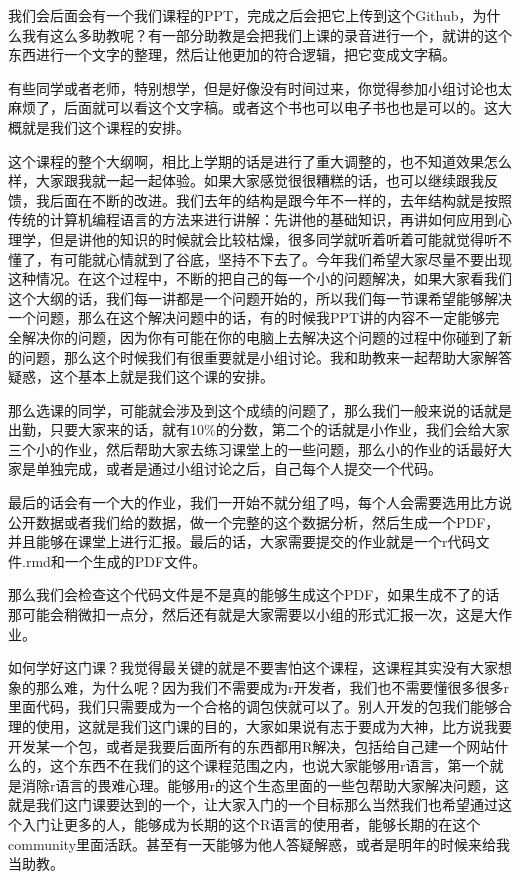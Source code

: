 \documentclass[
  oneside]{book}
\begin{document}
我们会后面会有一个我们课程的PPT，完成之后会把它上传到这个Github，为什么我有这么多助教呢？有一部分助教是会把我们上课的录音进行一个，就讲的这个东西进行一个文字的整理，然后让他更加的符合逻辑，把它变成文字稿。

有些同学或者老师，特别想学，但是好像没有时间过来，你觉得参加小组讨论也太麻烦了，后面就可以看这个文字稿。或者这个书也可以电子书也也是可以的。这大概就是我们这个课程的安排。

这个课程的整个大纲啊，相比上学期的话是进行了重大调整的，也不知道效果怎么样，大家跟我就一起一起体验。如果大家感觉很很糟糕的话，也可以继续跟我反馈，我后面在不断的改进。我们去年的结构是跟今年不一样的，去年结构就是按照传统的计算机编程语言的方法来进行讲解：先讲他的基础知识，再讲如何应用到心理学，但是讲他的知识的时候就会比较枯燥，很多同学就听着听着可能就觉得听不懂了，有可能就心情就到了谷底，坚持不下去了。今年我们希望大家尽量不要出现这种情况。在这个过程中，不断的把自己的每一个小的问题解决，如果大家看我们这个大纲的话，我们每一讲都是一个问题开始的，所以我们每一节课希望能够解决一个问题，那么在这个解决问题中的话，有的时候我PPT讲的内容不一定能够完全解决你的问题，因为你有可能在你的电脑上去解决这个问题的过程中你碰到了新的问题，那么这个时候我们有很重要就是小组讨论。我和助教来一起帮助大家解答疑惑，这个基本上就是我们这个课的安排。

那么选课的同学，可能就会涉及到这个成绩的问题了，那么我们一般来说的话就是出勤，只要大家来的话，就有10\%的分数，第二个的话就是小作业，我们会给大家三个小的作业，然后帮助大家去练习课堂上的一些问题，那么小的作业的话最好大家是单独完成，或者是通过小组讨论之后，自己每个人提交一个代码。

最后的话会有一个大的作业，我们一开始不就分组了吗，每个人会需要选用比方说公开数据或者我们给的数据，做一个完整的这个数据分析，然后生成一个PDF，并且能够在课堂上进行汇报。最后的话，大家需要提交的作业就是一个r代码文件.rmd和一个生成的PDF文件。

那么我们会检查这个代码文件是不是真的能够生成这个PDF，如果生成不了的话那可能会稍微扣一点分，然后还有就是大家需要以小组的形式汇报一次，这是大作业。

如何学好这门课？我觉得最关键的就是不要害怕这个课程，这课程其实没有大家想象的那么难，为什么呢？因为我们不需要成为r开发者，我们也不需要懂很多很多r里面代码，我们只需要成为一个合格的调包侠就可以了。别人开发的包我们能够合理的使用，这就是我们这门课的目的，大家如果说有志于要成为大神，比方说我要开发某一个包，或者是我要后面所有的东西都用R解决，包括给自己建一个网站什么的，这个东西不在我们的这个课程范围之内，也说大家能够用r语言，第一个就是消除r语言的畏难心理。能够用r的这个生态里面的一些包帮助大家解决问题，这就是我们这门课要达到的一个，让大家入门的一个目标那么当然我们也希望通过这个入门让更多的人，能够成为长期的这个R语言的使用者，能够长期的在这个community里面活跃。甚至有一天能够为他人答疑解惑，或者是明年的时候来给我当助教。
\end{document}
